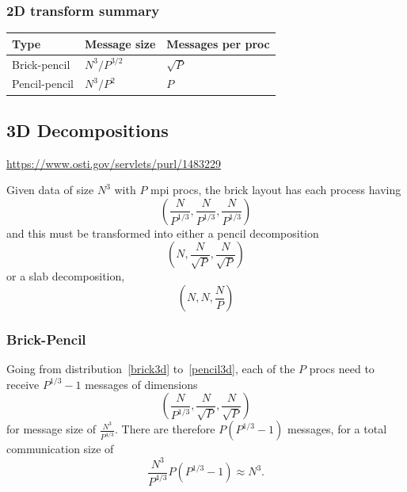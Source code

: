 \documentclass[12pt]{article}
\renewcommand{\(}{\left(}
\renewcommand{\)}{\right)}
\begin{document}
\subsubsection{2D transform summary}

\begin{centering}
  \begin{table}[htbp]
    \begin{tabular}{|l|l|l|}
      \hline
      Type          & Message size  & Messages per proc \\
      \hline
      Brick-pencil  & $N^3/P^{3/2}$ & $\sqrt{P}$          \\
      Pencil-pencil & $N^3/P^2$ & $P$        \\
      \hline
    \end{tabular}
  \end{table}
\end{centering}




\subsection{3D Decompositions}

\url{https://www.osti.gov/servlets/purl/1483229}

Given data of size $N^3$ with $P$ mpi procs, the brick layout has
each process having
\begin{dmath}
  \label{brick3d}
  \left(\frac{N}{P^{1/3}}, \frac{N}{P^{1/3}}, \frac{N}{P^{1/3}} \right)
\end{dmath}
and this must be transformed into either a pencil decomposition
\begin{dmath}
  \label{pencil3d}
  \left(N, \frac{N}{\sqrt{P}}, \frac{N}{\sqrt{P}} \right)
\end{dmath}
or a slab decomposition,
\begin{dmath}
  \label{slab3d}
  \left(N, N, \frac{N}{P} \right)
\end{dmath}

\subsubsection{Brick-Pencil}
Going from distribution~\eqref{brick3d} to~\eqref{pencil3d}, each of
the $P$ procs need to receive $P^{1/3}-1$ messages of dimensions 
\begin{dmath}
  \left(\frac{N}{P^{1/3}}, \frac{N}{\sqrt{P}}, \frac{N}{\sqrt{P}} \right)
\end{dmath}
for message size of $\frac{N^3}{P^{4/3}}$.  There are therefore
$P(P^{1/3}-1)$ messages, for a total communication size of
\begin{dmath}
  \frac{N^3}{P^{4/3}} P(P^{1/3}-1) \approx N^3.
\end{dmath}
\end{document}
